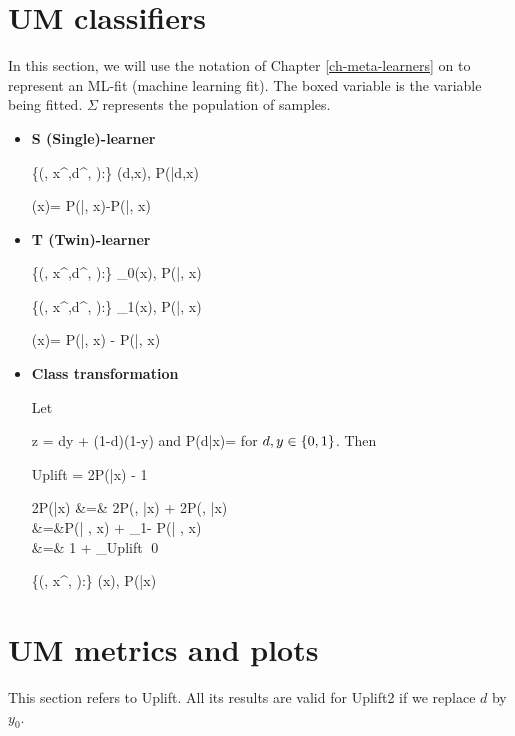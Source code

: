 \section{UM classifiers}
In this section, we will use the
notation of Chapter \ref{ch-meta-learners} on 
to represent an ML-fit (machine learning fit).
The boxed variable is the variable being fitted. $\Sigma$
represents the population of samples.
\begin{itemize}
\item {\bf S (Single)-learner}

\beq
\{(\s, x^\s,d^\s,  ):\s\in \Sigma\}
\mlarr \haty(d,x), P(|d,x)
\eeq

\beq
\delta(x)= P(|, x)-P(|, x)
\eeq

\item {\bf T (Twin)-learner}

\beq
\{(\s, x^\s,d^,  ):\s\in \Sigma\}
\mlarr \haty_0(x), P(|, x)
\eeq

\beq
\{(\s, x^\s,d^,  ):\s\in \Sigma\}
\mlarr \haty_1(x), P(|, x)
\eeq

\beq
\delta(x)= P(|, x)
- P(|, x)
\eeq

\item {\bf Class transformation}

\begin{claim}
Let 

\beq
z = dy + (1-d)(1-y)
\eeq
and
\beq 
P(d|x)=
\eeq
for $d, y\in \{0,1\}$.
Then

\beq
Uplift = 2P(|x) - 1
\eeq

\end{claim}
\proof

\beqa
2P(|x) &=& 2P(, |x) +  2P(, |x) 
\\
&=&P(| , x) +  
_{1- P(| , x)}
\\
&=&
1 + _{Uplift}
\eeqa
\qed


\beq
\{(\s, x^\s, ):\s\in \Sigma\}
\mlarr {}(x), P(|x)
\eeq


\end{itemize}


\section{UM metrics and plots}
This section refers to Uplift.
All its results are valid for 
Uplift2 if we replace $d$ by $y_0$.

